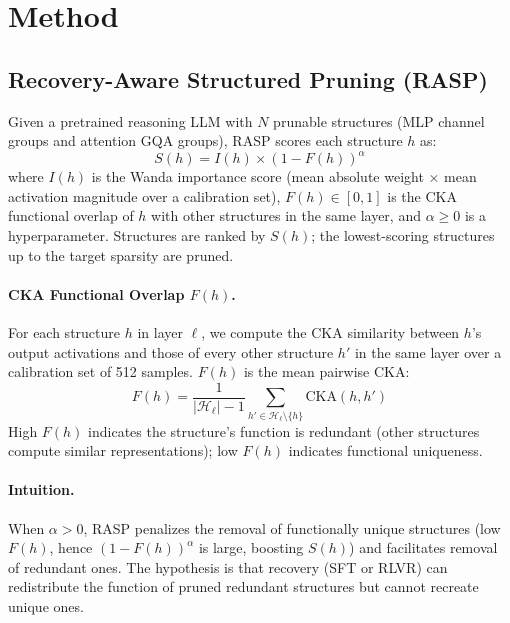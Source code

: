 \documentclass[11pt,a4paper]{article}
\begin{document}
\section{Method}
\label{sec:method}

\subsection{Recovery-Aware Structured Pruning (RASP)}

Given a pretrained reasoning LLM with $N$ prunable structures (MLP channel groups and attention GQA groups), RASP scores each structure $h$ as:
\begin{equation}
    S(h) = I(h) \times (1 - F(h))^\alpha
\end{equation}
where $I(h)$ is the Wanda importance score (mean absolute weight $\times$ mean activation magnitude over a calibration set), $F(h) \in [0,1]$ is the CKA functional overlap of $h$ with other structures in the same layer, and $\alpha \geq 0$ is a hyperparameter. Structures are ranked by $S(h)$; the lowest-scoring structures up to the target sparsity are pruned.

\paragraph{CKA Functional Overlap $F(h)$.}
For each structure $h$ in layer $\ell$, we compute the CKA similarity between $h$'s output activations and those of every other structure $h'$ in the same layer over a calibration set of 512 samples. $F(h)$ is the mean pairwise CKA:
\begin{equation}
    F(h) = \frac{1}{|\mathcal{H}_\ell| - 1} \sum_{h' \in \mathcal{H}_\ell \setminus \{h\}} \text{CKA}(h, h')
\end{equation}
High $F(h)$ indicates the structure's function is redundant (other structures compute similar representations); low $F(h)$ indicates functional uniqueness.

\paragraph{Intuition.}
When $\alpha > 0$, RASP penalizes the removal of functionally unique structures (low $F(h)$, hence $(1{-}F(h))^\alpha$ is large, boosting $S(h)$) and facilitates removal of redundant ones. The hypothesis is that recovery (SFT or RLVR) can redistribute the function of pruned redundant structures but cannot recreate unique ones.
\end{document}

